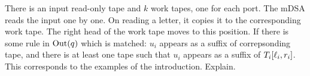     There is an input read-only tape  and $k$ work tapes, one for each port. The mDSA reads the input one by one. On reading a letter, it copies it to the corresponding work tape. The right head of the work tape moves to this position. If there is some rule in $\operatorname{Out}(q)$ which is matched: $u_i$ appears as a suffix of correpsonding tape, and there is at least one tape such that $u_i$ appears as a suffix of $T_i[\ell_i, r_i]$. This corresponds to the examples of the introduction. Explain.

